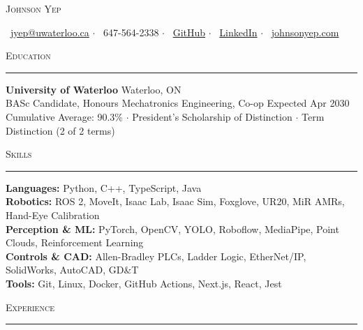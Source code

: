 \documentclass[letterpaper,10pt]{article}
\newcommand{\header}[1]{%
    \vspace{4pt}%
    {\textsc{#1}}\par\vspace{-7pt}%
    \rule{\linewidth}{0.4pt}\par\vspace{1pt}%
}
\begin{document}
\vspace*{-12pt}
{\centering
    {\Huge \scshape Johnson Yep}\par
    \vspace{4pt}
    {\small
    \faEnvelope\ \href{mailto:jyep@uwaterloo.ca}{jyep@uwaterloo.ca} $\cdot$
    \faPhone\ 647-564-2338 $\cdot$
    \faGithub\ \href{https://github.com/johnson-yep}{GitHub} $\cdot$
    \faLinkedin\ \href{https://www.linkedin.com/in/johnson-yep-680101277/}{LinkedIn} $\cdot$
    \faGlobe\ \href{https://johnsonyep.com/}{johnsonyep.com}\par}
}

\header{Education}
\textbf{University of Waterloo} \hfill Waterloo, ON\\
BASc Candidate, Honours Mechatronics Engineering, Co-op \hfill Expected Apr 2030\\
Cumulative Average: 90.3\% $\cdot$ President's Scholarship of Distinction $\cdot$ Term Distinction (2 of 2 terms)\par

\header{Skills}
\textbf{Languages:} Python, C++, TypeScript, Java\\
\textbf{Robotics:} ROS 2, MoveIt, Isaac Lab, Isaac Sim, Foxglove, UR20, MiR AMRs, Hand-Eye Calibration\\
\textbf{Perception \& ML:} PyTorch, OpenCV, YOLO, Roboflow, MediaPipe, Point Clouds, Reinforcement Learning\\
\textbf{Controls \& CAD:} Allen-Bradley PLCs, Ladder Logic, EtherNet/IP, SolidWorks, AutoCAD, GD\&T\\
\textbf{Tools:} Git, Linux, Docker, GitHub Actions, Next.js, React, Jest\par

\header{Experience}
\end{document}
